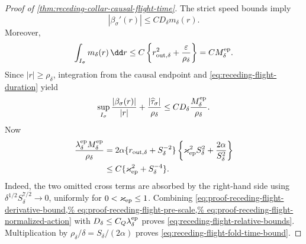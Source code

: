 \begin{proof}[Proof of
\cref{thm:receding-collar-causal-flight-time}]
The strict speed bounds imply
\begin{equation}
 |\beta_\sigma'(r)|\le CD_\delta m_\delta(r).
                                                        \label{eq:proof-receding-flight-derivative-bound}
\end{equation}
Moreover,
\begin{equation}
 \int_{I_\sigma}m_\delta(r)\,\dd r
 \le C\left\{r_{{\rm out},\delta}^2
                   +\frac{\varepsilon}{\rho_\delta}\right\}
 =CM_\delta^{\rm ep}.                             \label{eq:proof-receding-flight-action-integral}
\end{equation}
Since \(|r|\ge\rho_\delta\), integration from the causal endpoint and
\cref{eq:receding-flight-duration} yield
\begin{equation}
 \sup_{I_\sigma}\frac{|\beta_\sigma(r)|}{|r|}
       +\frac{|\widehat\tau_\sigma|}{\rho_\delta}
 \le C D_\delta\frac{M_\delta^{\rm ep}}{\rho_\delta}.
                                                        \label{eq:proof-receding-flight-pre-scale}
\end{equation}
Now
\begin{align}
 \frac{\lambda_\delta^{\rm ep}M_\delta^{\rm ep}}
      {\rho_\delta}
 &=
 2\alpha\{r_{{\rm out},\delta}+S_\delta^{-2}\}
 \left\{\varkappa_{\rm ep}^2S_\delta^2
                    +\frac{2\alpha}{S_\delta^2}\right\}\notag\\
 &\le C\{\varkappa_{\rm ep}^2+S_\delta^{-4}\}.
                                                        \label{eq:proof-receding-flight-normalized-action}
\end{align}
Indeed, the two omitted cross terms are absorbed by the right-hand side
using
\(\delta^{1/2}S_\delta^{7/2}\to0\), uniformly for
\(0<\varkappa_{\rm ep}\le1\).  Combining
\cref{eq:proof-receding-flight-derivative-bound,%
eq:proof-receding-flight-pre-scale,%
eq:proof-receding-flight-normalized-action}
with \(D_\delta\le C_Q\lambda_\delta^{\rm ep}\) proves
\cref{eq:receding-flight-relative-bounds}.  Multiplication by
\(\rho_\delta/\delta=S_\delta/(2\alpha)\) proves
\cref{eq:receding-flight-fold-time-bound}.


\end{proof}
